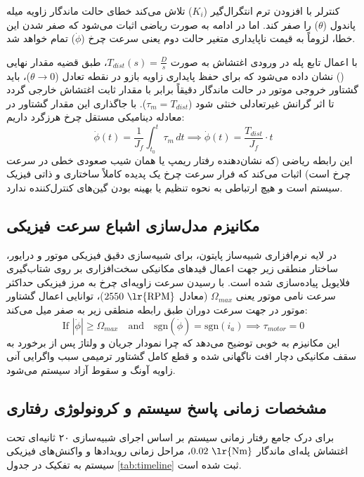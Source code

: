 \documentclass[12pt]{report}
\begin{document}
کنترلر  با افزودن ترم انتگرال‌گیر ($K_i$) تلاش می‌کند خطای حالت ماندگار زاویه میله پاندول ($\theta$) را صفر کند. اما در ادامه به صورت ریاضی اثبات می‌شود که صفر شدن این خطا، لزوماً به قیمت ناپایداری متغیر حالت دوم یعنی سرعت چرخ ($\dot{\phi}$) تمام خواهد شد.

با اعمال تابع پله در ورودی اغتشاش به صورت $T_{dist}(s) = \frac{D}{s}$، طبق قضیه مقدار نهایی () نشان داده می‌شود که برای حفظ پایداری زاویه بازو در نقطه تعادل ($\theta \to 0$)، باید گشتاور خروجی موتور در حالت ماندگار دقیقاً برابر با مقدار ثابت اغتشاش خارجی گردد تا اثر گرانش غیرتعادلی خنثی شود ($\tau_m = T_{dist}$). با جاگذاری این مقدار گشتاور در معادله دینامیکی مستقل چرخ هرزگرد داریم:
\[ \dot{\phi}(t) = \frac{1}{J_f} \int_{t_0}^{t} \tau_m \, dt \implies \dot{\phi}(t) = \frac{T_{dist}}{J_f} \cdot t \]
این رابطه ریاضی (که نشان‌دهنده رفتار ریمپ یا همان شیب صعودی خطی در سرعت چرخ است) اثبات می‌کند که فرار سرعت چرخ یک پدیده کاملاً ساختاری و ذاتی فیزیک سیستم است و هیچ ارتباطی به نحوه تنظیم یا بهینه بودن گین‌های کنترل‌کننده  ندارد.

\subsection{مکانیزم مدل‌سازی اشباع سرعت فیزیکی}
در لایه نرم‌افزاری شبیه‌ساز پایتون، برای شبیه‌سازی دقیق فیزیکی موتور و درایور، ساختار منطقی زیر جهت اعمال قیدهای مکانیکی سخت‌افزاری بر روی شتاب‌گیری فلایویل پیاده‌سازی شده است. با رسیدن سرعت زاویه‌ای چرخ به مرز فیزیکی حداکثر سرعت نامی موتور یعنی $\Omega_{max}$ (معادل $2550 \text{ \lr{RPM}}$)، توانایی اعمال گشتاور موتور در جهت سرعت دوران طبق رابطه منطقی زیر به صفر میل می‌کند:
\[ \text{If } |\dot{\phi}| \ge \Omega_{max} \quad \text{and} \quad \text{sgn}(\dot{\phi}) = \text{sgn}(i_a) \implies \tau_{motor} = 0 \]
این مکانیزم به خوبی توضیح می‌دهد که چرا نمودار جریان و ولتاژ پس از برخورد به سقف مکانیکی دچار افت ناگهانی شده و قطع کامل گشتاور ترمیمی سبب واگرایی آنی زاویه آونگ و سقوط آزاد سیستم می‌شود.

\subsection{مشخصات زمانی پاسخ سیستم و کرونولوژی رفتاری}
برای درک جامع رفتار زمانی سیستم بر اساس اجرای شبیه‌سازی ۲۰ ثانیه‌ای تحت اغتشاش پله‌ای ماندگار $0.02 \text{ \lr{Nm}}$، مراحل زمانی رویدادها و واکنش‌های فیزیکی سیستم به تفکیک در جدول \ref{tab:timeline} ثبت شده است.
\end{document}
